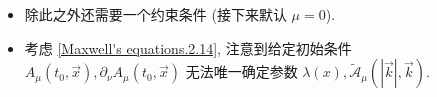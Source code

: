 \begin{itemize}
\begin{itemize}
		\item 当 $\mu \neq 0$ 时,
		\begin{equation}
			\begin{dcases}
				\text{on shell:} & \vec{\tilde{A}} \ \text{取值任意} \\
				\text{off shell:} & \vec{k} \cdot \vec{\tilde{A}} = 0 \Longrightarrow \vec{\tilde{A}} = \tilde{A}_0 = 0
			\end{dcases} \Longrightarrow \tilde{A}_\mu(k) = \tilde{\mathcal{A}}_\mu(k) 2 \pi \delta(k^2 - \mu^2).
		\end{equation}
		其中 $\vec{\tilde{\mathcal{A}}}(k)$ 是任意函数, 且 $\mathrm{sign}(k^0) \omega_k \tilde{\mathcal{A}}_0 - \vec{k} \cdot \vec{\tilde{\mathcal{A}}} = 0$. 因此
		\begin{equation}
			A_\mu(x) = \int \frac{d^3 k}{(2 \pi)^3 2 \omega_k} \Big( \tilde{\mathcal{A}}_\mu(\omega_k, \vec{k}) e^{- i (\omega_k x^0 - \vec{k} \cdot \vec{x})} + \tilde{\mathcal{A}}^*_\mu(\omega_k, \vec{k}) e^{i (\omega_k x^0 - \vec{k} \cdot \vec{x})} \Big).
		\end{equation}
	\end{itemize}
	
	\begin{tcolorbox}[title=calculation:]
		对 \eqref{Maxwell's equations.2.12} 两边同时内积 $\vec{k}$, 有
		\begin{equation}
			(k^2 - \mu^2) (\vec{k} \cdot \vec{\tilde{A}}) = 0 \quad \text{or} \quad \omega_k = |\vec{k}|,
		\end{equation}
		因此 $\mu = 0$ 时 \eqref{Maxwell's equations.2.12} 自然成立, 而 massive 情况下 $\tilde{A}_0 = \vec{k} \cdot \vec{\tilde{A}} = 0$ 除非 on shell.
	\end{tcolorbox}
	
	\item 除此之外还需要一个约束条件 (接下来默认 $\mu = 0$).
	
	\item 考虑 \eqref{Maxwell's equations.2.14}, 注意到给定初始条件 $A_\mu(t_0, \vec{x}), \partial_\nu A_\mu(t_0, \vec{x})$ 无法唯一确定参数 $\lambda(x), \tilde{\mathcal{A}}_\mu(|\vec{k}|, \vec{k})$.
	

\end{itemize}
